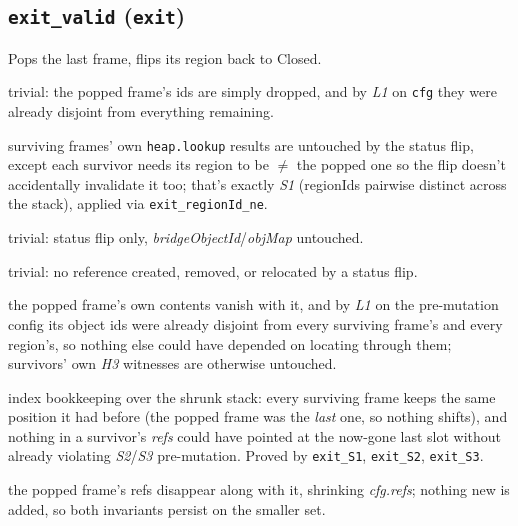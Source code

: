 \documentclass[11pt]{article}
\newcommand{\op}[1]{\texttt{#1}}
\newcommand{\thm}[1]{\textbf{\texttt{#1}}}
\begin{document}
\subsection{\thm{exit\_valid} (\op{exit})}
Pops the last frame, flips its region back to Closed.
\begin{description}[nosep]
  \item[L1] trivial: the popped frame's ids are simply dropped, and by \textit{L1} on \op{cfg}
    they were already disjoint from everything remaining.
  \item[L2] surviving frames' own \texttt{heap.lookup} results are untouched by the status flip,
    except each survivor needs its region to be $\ne$ the popped one so the flip doesn't
    accidentally invalidate it too; that's exactly \textit{S1} (regionIds pairwise distinct across
    the stack), applied via \texttt{exit\_regionId\_ne}.
  \item[H1] trivial: status flip only, \textit{bridgeObjectId}/\textit{objMap} untouched.
  \item[H2] trivial: no reference created, removed, or relocated by a status flip.
  \item[H3] the popped frame's own contents vanish with it, and by \textit{L1} on the pre-mutation
    config its object ids were already disjoint from every surviving frame's and every region's, so
    nothing else could have depended on locating through them; survivors' own \textit{H3}
    witnesses are otherwise untouched.
  \item[S1, S2, S3] index bookkeeping over the shrunk stack: every surviving frame keeps the same
    position it had before (the popped frame was the \emph{last} one, so nothing shifts), and
    nothing in a survivor's \textit{refs} could have pointed at the now-gone last slot without
    already violating \textit{S2}/\textit{S3} pre-mutation. Proved by \texttt{exit\_S1},
    \texttt{exit\_S2}, \texttt{exit\_S3}.
  \item[HS1, HS2] the popped frame's refs disappear along with it, shrinking \textit{cfg.refs};
    nothing new is added, so both invariants persist on the smaller set.
\end{description}
\end{document}
